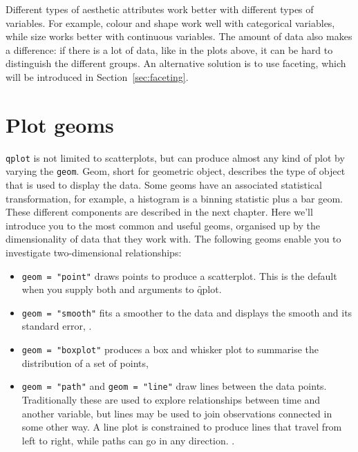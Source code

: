 % 


Different types of aesthetic attributes work better with different types of variables. For example, colour and shape work well with categorical variables, while size works better with continuous variables. The amount of data also makes a difference: if there is a lot of data, like in the plots above, it can be hard to distinguish the different groups. An alternative solution is to use faceting, which will be introduced in Section~\ref{sec:faceting}.

\section{Plot geoms}\label{sec:plot_geoms}

{\tt qplot} is not limited to scatterplots, but can produce almost any kind of plot by varying the {\tt geom}. Geom, short for geometric object, describes the type of object that is used to display the data. Some geoms have an associated statistical transformation, for example, a histogram is a binning statistic plus a bar geom. These different components are described in the next chapter. Here we'll introduce you to the most common and useful geoms, organised up by the dimensionality of data that they work with. The following geoms enable you to investigate two-dimensional relationships:

\begin{itemize}

  \item {\tt geom = "point"} draws points to produce a scatterplot. This is the default when you supply both  and  arguments to \f{qplot}.

  \item {\tt geom = "smooth"} fits a smoother to the data and displays the smooth and its standard error, .

  \item {\tt geom = "boxplot"} produces a box and whisker plot to summarise the distribution of a set of points, 

  \item {\tt geom = "path"} and {\tt geom = "line"} draw lines between the data points.  Traditionally these are used to explore relationships between time and another variable, but lines may be used to join observations connected in some other way.  A line plot is constrained to produce lines that travel from left to right, while paths can go in any direction.  .
\end{itemize}


